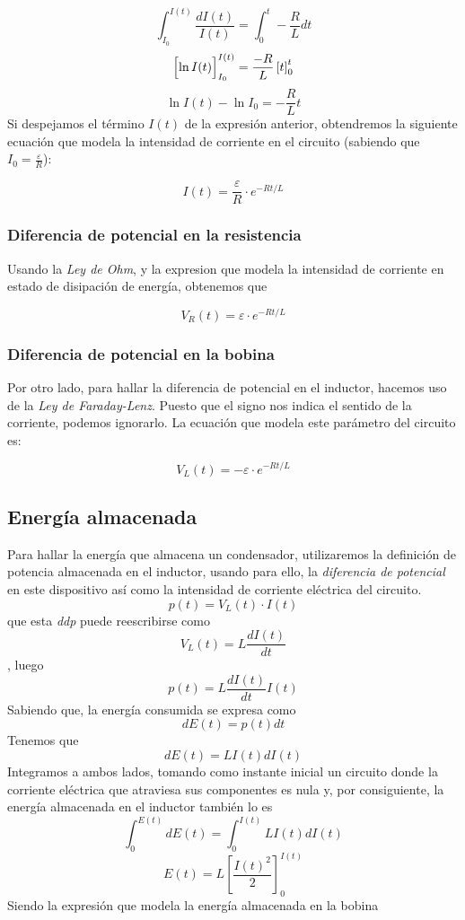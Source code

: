 \documentclass[../main.tex]{subfiles}
\begin{document}
$$\int_{I_0}^{I(t)} \frac{d I(t)}{I(t)} = \int_0^{t} -\frac{R}{L}d t $$
$$\Bigl[ \ln{I(t)} \Bigr]_{I_0}^{I(t)} = \frac{-R}{L} \left[ t \right]_0^{t}$$
$$\ln{I(t)} - \ln{I_0} = -\frac{R}{L}t$$
Si despejamos el término $I(t)$ de la expresión anterior, obtendremos la siguiente ecuación que modela la intensidad de corriente en el circuito (sabiendo que $I_0 = \frac{\varepsilon}{R}$):

\begin{equation}
    I(t) = \frac{\varepsilon}{R} \cdot e^{-Rt/L} 
\end{equation}



\subsubsection{Diferencia de potencial en la resistencia}
\label{part::descarga_inductor_2}
Usando la \textit{Ley de Ohm}, y la expresion que modela la intensidad de corriente en estado de disipación de energía, obtenemos que

\begin{equation}
    V_R(t) = \varepsilon \cdot e^{-Rt/L}
\end{equation}


\subsubsection{Diferencia de potencial en la bobina}
\label{part::descarga_inductor_3}
Por otro lado, para hallar la diferencia de potencial en el inductor, hacemos uso de la \textit{Ley de Faraday-Lenz}. Puesto que el signo nos indica el sentido de la corriente, podemos ignorarlo. La ecuación que modela este parámetro del circuito es:

\begin{equation}
    V_L(t) = -\varepsilon \cdot e^{-Rt/L}
\end{equation}


\subsection{Energía almacenada}
\label{part::energía_inductor}
Para hallar la energía que almacena un condensador, utilizaremos la definición de potencia almacenada en el inductor, usando para ello, la \textit{diferencia de potencial} en este dispositivo así como la intensidad de corriente eléctrica del circuito.
$$p(t) = V_L(t) \cdot I(t)$$
que esta \textit{ddp} puede reescribirse como
$$V_L(t) = L \frac{d I(t)}{d t}$$
, luego
$$p(t) = L \frac{d I(t)}{d t} I(t)$$
Sabiendo que, la energía consumida se expresa como
$$d E(t) = p(t) d t$$
Tenemos que
$$d E(t) = L I(t) d I(t)$$
Integramos a ambos lados, tomando como instante inicial un circuito donde la corriente eléctrica que atraviesa sus componentes es nula y, por consiguiente, la energía almacenada en el inductor también lo es
$$\int_0^{E(t)} d E(t) = \int_0^{I(t)} L I(t) d I(t)$$
$$E(t) = L \left[ \frac{I(t)^2}{2}\right]_0^{I(t)}$$
Siendo la expresión que modela la energía almacenada en la bobina
\end{document}
